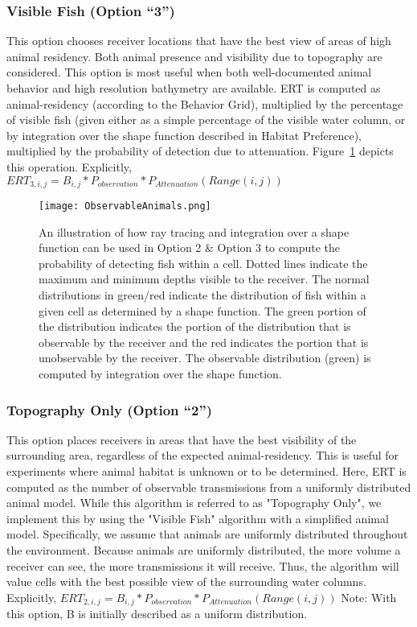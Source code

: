 \subsubsection{Visible Fish (Option “3”)}
\label{bias3}
This option chooses receiver locations that have the best view of areas of high animal residency.  Both animal presence and visibility due to topography are considered. This option is most useful when both well-documented animal behavior and high resolution bathymetry are available.  ERT is computed as animal-residency (according to the Behavior Grid), multiplied by the percentage of visible fish (given either as a simple percentage of the visible water column, or by integration over the shape function described in Habitat Preference), multiplied by the probability of detection due to attenuation.  Figure~\ref{observableAnimals} depicts this operation.\newline
Explicitly,
$ERT_{3,i,j} =  B_{i,j} * P_{observation} * P_{Attenuation}(Range(i,j))$

\begin{figure}[h]
	\label{observableAnimals}
	\centering
	\texttt{[image: ObservableAnimals.png]}
	\caption{An illustration of how ray tracing and integration over a shape function can be used in Option 2 \& Option 3 to compute the probability of detecting fish within a cell.  Dotted lines indicate the maximum and minimum depths visible to the receiver.  The normal distributions in green/red indicate the distribution of fish within a given cell as determined by a shape function.  The green portion of the distribution indicates the portion of the distribution that is observable by the receiver and the red indicates the portion that is unobservable by the receiver.  The observable distribution (green) is computed by integration over the shape function.}
\end{figure}

\subsubsection{Topography Only (Option “2”)}
\label{bias2}
This option places receivers in areas that have the best visibility of the surrounding area, regardless of the expected animal-residency.  This is useful for experiments where animal habitat is unknown or to be determined.  Here, ERT is computed as the number of observable transmissions from a uniformly distributed animal model.  While this algorithm is referred to as "Topography Only", we implement this by using the "Visible Fish" algorithm with a simplified animal model.  Specifically, we assume that animals are uniformly distributed throughout the environment.  Because animals are uniformly distributed, the more volume a receiver can see, the more transmissions it will receive.  Thus, the algorithm will value cells with the best possible view of the surrounding water columns.\newline
Explicitly,
$ERT_{2,i,j} =  B_{i,j} * P_{observation} * P_{Attenuation}(Range(i,j))$\newline
Note: With this option, B is initially described as a uniform distribution.


